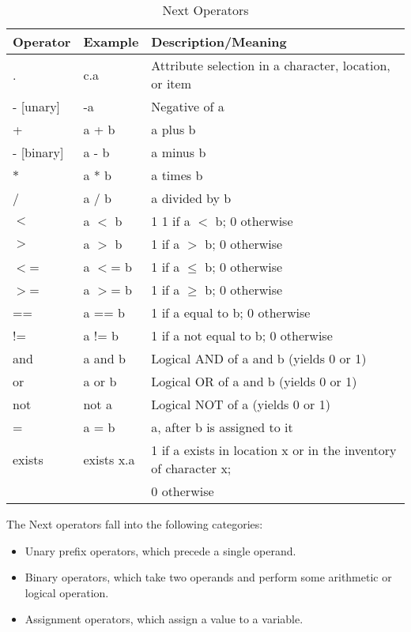 \documentclass[12pt]{article}
\begin{document}
\begin{table}[htdp]
\caption{Next Operators}
\begin{center}
\begin{tabular}{|l|l|l|}
\hline
\textbf{Operator} & \textbf{Example} & \textbf{Description/Meaning} \\
\hline
.&c.a&Attribute selection in a character, location, or item \\
\hline
- [unary]& -a&Negative of a \\
\hline
+ & a + b & a plus b \\
- [binary]& a - b & a minus b\\
$*$ & a * b & a times b \\
/ & a / b & a divided by b \\
\hline
$<$ & a $<$ b & 1 1 if a $<$ b; 0 otherwise \\
$>$ & a $>$ b & 1 if a $>$ b; 0 otherwise \\
$<$= & a $<$= b& 1 if a $\leq$ b; 0 otherwise\\
$>$=& a $>$= b & 1 if a $\geq$ b; 0 otherwise \\
== & a == b& 1 if a equal to b; 0 otherwise \\
!= & a != b & 1 if a not equal to b; 0 otherwise \\
\hline
and & a and b & Logical AND of a and b (yields 0 or 1) \\
or & a or b & Logical OR of a and b (yields 0 or 1) \\
not & not a & Logical NOT of a (yields 0 or 1) \\
\hline
= & a = b & a, after b is assigned to it \\
\hline
exists & exists x.a & 1 if a exists in location x or in the inventory of character x; \\ & & 0 otherwise \\
\hline
\end{tabular}
\end{center}
\label{operators}
\end{table}%

\noindent The Next operators fall into the following categories:
\begin{itemize}
\item Unary prefix operators, which precede a single operand.
\item Binary operators, which take two operands and perform some arithmetic or logical operation.
\item Assignment operators, which assign a value to a variable.
\end{itemize}
\end{document}
